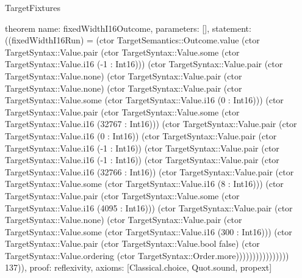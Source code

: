 \begin{lexlean}{TargetFixtures}
\begin{semanticmodule}
theorem{
  name: fixedWidthI16Outcome,
  parameters: [],
  statement: ((fixedWidthI16Run) = (ctor TargetSemantics::Outcome.value (ctor TargetSyntax::Value.pair (ctor TargetSyntax::Value.some (ctor TargetSyntax::Value.i16 (-1 : Int16))) (ctor TargetSyntax::Value.pair (ctor TargetSyntax::Value.none) (ctor TargetSyntax::Value.pair (ctor TargetSyntax::Value.none) (ctor TargetSyntax::Value.pair (ctor TargetSyntax::Value.some (ctor TargetSyntax::Value.i16 (0 : Int16))) (ctor TargetSyntax::Value.pair (ctor TargetSyntax::Value.some (ctor TargetSyntax::Value.i16 (32767 : Int16))) (ctor TargetSyntax::Value.pair (ctor TargetSyntax::Value.i16 (0 : Int16)) (ctor TargetSyntax::Value.pair (ctor TargetSyntax::Value.i16 (-1 : Int16)) (ctor TargetSyntax::Value.pair (ctor TargetSyntax::Value.i16 (-1 : Int16)) (ctor TargetSyntax::Value.pair (ctor TargetSyntax::Value.i16 (32766 : Int16)) (ctor TargetSyntax::Value.pair (ctor TargetSyntax::Value.some (ctor TargetSyntax::Value.i16 (8 : Int16))) (ctor TargetSyntax::Value.pair (ctor TargetSyntax::Value.some (ctor TargetSyntax::Value.i16 (4095 : Int16))) (ctor TargetSyntax::Value.pair (ctor TargetSyntax::Value.none) (ctor TargetSyntax::Value.pair (ctor TargetSyntax::Value.some (ctor TargetSyntax::Value.i16 (300 : Int16))) (ctor TargetSyntax::Value.pair (ctor TargetSyntax::Value.bool false) (ctor TargetSyntax::Value.ordering (ctor TargetSyntax::Order.more)))))))))))))))) 137)),
  proof: reflexivity{},
  axioms: [Classical.choice, Quot.sound, propext]
}


\end{semanticmodule}
\end{lexlean}
